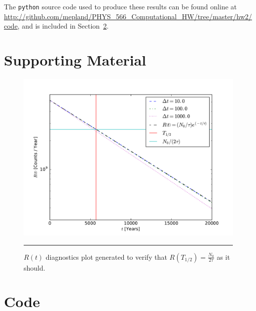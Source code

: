 \documentclass[notitlepage,aps,prd,nofootinbib]{revtex4-1}
\begin{document}
The \texttt{python} source code used to produce these results can be found online at \url{http://github.com/mepland/PHYS_566_Computational_HW/tree/master/hw2/code}, and is included in Section~\ref{sec:code}.

\clearpage
\section{Supporting Material}
\label{sec:Supporting_Material}

\begin{figure}[!htbc]
  \centering
  \includegraphics[width=.70\textwidth]{output/diagnostic_plot.pdf}
	{\par\nobreak\rule[9pt]{35em}{0.5pt}\vspace{-5mm}}
	\caption{$R\left(t\right)$ diagnostics plot generated to verify that $R\left(T_{1/2}\right) = \frac{N_{0}}{2\tau}$ as it should.}
	\label{fig:diagnostic_plot}
\end{figure}

\clearpage


\clearpage
\section{Code}
\label{sec:code}


\end{document}
